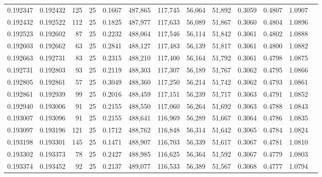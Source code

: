 \begin{tabular}{rrrrrrrrrrrrr}
0.192347 & 0.192432 &   125 &  25 &                                     0.1667 & 487,865 & 117,745 &  56,064 &  51,892 & 0.3059 & 0.4807 & 1.0907 \\
0.192432 & 0.192522 &   112 &  25 &                                     0.1825 & 487,977 & 117,633 &  56,089 &  51,867 & 0.3060 & 0.4804 & 1.0896 \\
0.192523 & 0.192602 &    87 &  25 &                                     0.2232 & 488,064 & 117,546 &  56,114 &  51,842 & 0.3061 & 0.4802 & 1.0888 \\
0.192603 & 0.192662 &    63 &  25 &                                     0.2841 & 488,127 & 117,483 &  56,139 &  51,817 & 0.3061 & 0.4800 & 1.0882 \\
0.192663 & 0.192731 &    83 &  25 &                                     0.2315 & 488,210 & 117,400 &  56,164 &  51,792 & 0.3061 & 0.4798 & 1.0875 \\
0.192731 & 0.192803 &    93 &  25 &                                     0.2119 & 488,303 & 117,307 &  56,189 &  51,767 & 0.3062 & 0.4795 & 1.0866 \\
0.192805 & 0.192861 &    57 &  25 &                                     0.3049 & 488,360 & 117,250 &  56,214 &  51,742 & 0.3062 & 0.4793 & 1.0861 \\
0.192861 & 0.192939 &    99 &  25 &                                     0.2016 & 488,459 & 117,151 &  56,239 &  51,717 & 0.3063 & 0.4791 & 1.0852 \\
0.192940 & 0.193006 &    91 &  25 &                                     0.2155 & 488,550 & 117,060 &  56,264 &  51,692 & 0.3063 & 0.4788 & 1.0843 \\
0.193007 & 0.193096 &    91 &  25 &                                     0.2155 & 488,641 & 116,969 &  56,289 &  51,667 & 0.3064 & 0.4786 & 1.0835 \\
0.193097 & 0.193196 &   121 &  25 &                                     0.1712 & 488,762 & 116,848 &  56,314 &  51,642 & 0.3065 & 0.4784 & 1.0824 \\
0.193198 & 0.193301 &   145 &  25 &                                     0.1471 & 488,907 & 116,703 &  56,339 &  51,617 & 0.3067 & 0.4781 & 1.0810 \\
0.193302 & 0.193373 &    78 &  25 &                                     0.2427 & 488,985 & 116,625 &  56,364 &  51,592 & 0.3067 & 0.4779 & 1.0803 \\
0.193374 & 0.193452 &    92 &  25 &                                     0.2137 & 489,077 & 116,533 &  56,389 &  51,567 & 0.3068 & 0.4777 & 1.0794 \\

\end{tabular}
